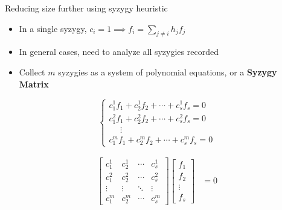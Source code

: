 \documentclass[xcolor=dvipsnames]{beamer}
\newcommand{\bi}{\begin{itemize}}
\newcommand{\ei}{\end{itemize}}
\begin{document}
\begin{frame}{\large{Reducing size further using syzygy heuristic}}
\bi
\item In a single syzygy, $c_i=1 \implies f_i = \sum_{j\neq i} h_jf_j$
\item In general cases, need to analyze all syzygies recorded
\item Collect $m$ syzygies as a system of polynomial equations, or a {\bf Syzygy Matrix}
\ei
\hspace{-0.1in}
\begin{minipage}{2.5in}
\begin{equation*} \label{eqn:syz}
 \begin{cases}
 c_1^1f_1+c_2^1f_2+\cdots+c_s^1f_s = 0\\
 c_1^2f_1+c_2^2f_2+\cdots+c_s^2f_s  = 0\\
 \ \ \ \ \ \  \vdots \\
 c_1^mf_1+c_2^mf_2+\cdots+c_s^mf_s = 0  
 \end{cases}
\end{equation*}
\end{minipage}
\hspace{-0.3in}
\begin{minipage}{2in}
\begin{center}
\begin{align*}
\label{mat:syzygy}
   \begin{bmatrix}
           c_1^1 & c_2^1 & \cdots & c_s^1 \\
           c_1^2 & c_2^2 & \cdots & c_s^2 \\
           \vdots & \vdots & \ddots & \vdots \\
           c_1^m & c_2^m & \cdots & c_s^m
         \end{bmatrix}
    \begin{bmatrix}
           f_{1} \\
           f_{2} \\
           \vdots \\
           f_{s}
         \end{bmatrix}
         &= 0
  \end{align*}

\end{center}
\end{minipage}
\end{frame}
\end{document}
